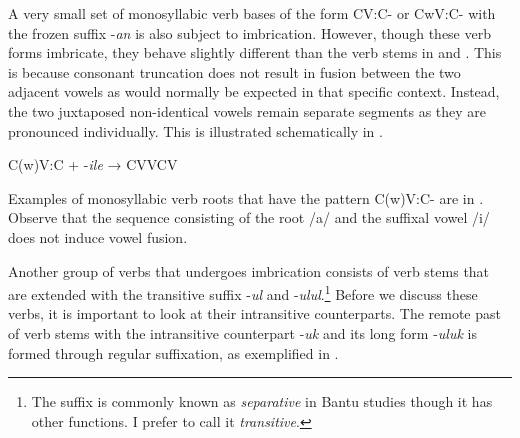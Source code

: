 \documentclass[output=paper]{langsci/langscibook}
\begin{document}
A very small set of monosyllabic verb bases of the form CV:C- or CwV:C- with the frozen suffix -\textit{an} is also subject to imbrication. However, though these verb forms imbricate, they behave slightly different than the verb stems in  and . This is because consonant truncation does not result in fusion between the two adjacent vowels as would normally be expected in that specific context. Instead, the two juxtaposed non-identical vowels remain separate segments as they are pronounced individually. This is illustrated schematically in . 

\ea
\label{ex:6.kawasha}
C(w)V:C + -\textit{ile}  → CVVCV
\z

Examples of monosyllabic verb roots that have the pattern C(w)V:C- are in . Observe that the sequence consisting of the root /a/ and the suffixal vowel /i/ does not induce vowel fusion. 

\begin{table}

\caption{Imbrication in monosyllabic C(w)V:C- roots}
\label{tab:21.kawasha}

\end{table}


Another group of verbs that undergoes imbrication consists of verb stems that are extended with the transitive suffix -\textit{ul }and -\textit{ulul}.\footnote{The suffix is commonly known as \textit{separative} in Bantu studies though it has other functions. I prefer to call it \textit{transitive}.} Before we discuss these verbs, it is important to look at their intransitive counterparts. The remote past of verb stems with the intransitive counterpart -\textit{uk} and its long form -\textit{uluk} is formed through regular suffixation, as exemplified in .
\end{document}

